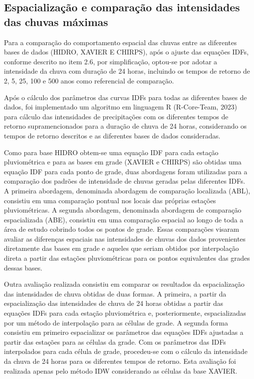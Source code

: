 \documentclass[
]{agujournal2019}
\begin{document}
\subsection{Espacialização e comparação das intensidades das chuvas
máximas}\label{espacializauxe7uxe3o-e-comparauxe7uxe3o-das-intensidades-das-chuvas-muxe1ximas}

Para a comparação do comportamento espacial das chuvas entre as
diferentes bases de dados (HIDRO, XAVIER E CHIRPS), após o ajuste das
equações IDFs, conforme descrito no item 2.6, por simplificação,
optou-se por adotar a intensidade da chuva com duração de 24 horas,
incluindo os tempos de retorno de 2, 5, 25, 100 e 500 anos como
referencial de comparação.

Após o cálculo dos parâmetros das curvas IDFs para todas as diferentes
bases de dados, foi implementado um algoritmo em linguagem R
(R-Core-Team, 2023) para cálculo das intensidades de precipitações com
os diferentes tempos de retorno supramencionados para a duração de chuva
de 24 horas, considerando os tempos de retorno descritos e as diferentes
bases de dados consideradas.

Como para base HIDRO obtem-se uma equação IDF para cada estação
pluviométrica e para as bases em grade (XAVIER e CHIRPS) são obtidas uma
equação IDF para cada ponto de grade, duas abordagens foram utilizadas
para a comparação dos padrões de intensidade de chuvas geradas pelas
diferentes IDFs. A primeira abordagem, denominada abordagem de
comparação localizada (ABL), consistiu em uma comparação pontual nos
locais das próprias estações pluviométricas. A segunda abordagem,
denominada abordagem de comparação espacializada (ABE), consistiu em uma
comparação espacial ao longo de toda a área de estudo cobrindo todos os
pontos de grade. Essas comparações visaram avaliar as diferenças
espaciais nas intensidades de chuvas dos dados provenientes diretamente
das bases em grade e aqueles que seriam obtidos por interpolação direta
a partir das estações pluviométricas para os pontos equivalentes das
grades dessas bases.

Outra avaliação realizada consistiu em comparar os resultados da
espacialização das intensidades de chuva obtidas de duas formas. A
primeira, a partir da espacialização das intensidades de chuva de 24
horas obtidas a partir das equações IDFs para cada estação pluviométrica
e, posteriormente, espacializadas por um método de interpolação para as
células de grade. A segunda forma consistiu em primeiro espacializar os
parâmetros das equações IDFs ajustadas a partir das estações para as
células da grade. Com os parâmetros das IDFs interpolados para cada
célula de grade, procedeu-se com o cálculo da intensidade da chuva de 24
horas para os diferentes tempos de retorno. Esta avaliação foi realizada
apenas pelo método IDW considerando as células da base XAVIER.
\end{document}
